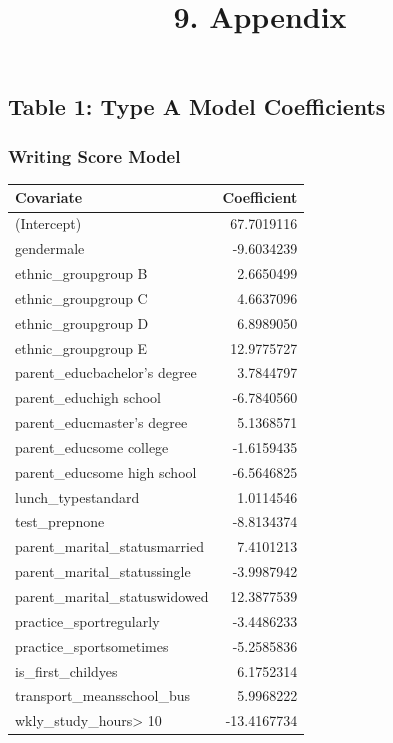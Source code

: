 \documentclass[
]{article}
\title{9. Appendix}
\author{}
\date{\vspace{-2.5em}}
\begin{document}
\maketitle

\subsection{Table 1: Type A Model
Coefficients}\label{table-1-type-a-model-coefficients}

\subsubsection{Writing Score Model}\label{writing-score-model}

\begin{longtable}[]{@{}lr@{}}
\toprule\noalign{}
Covariate & Coefficient \\
\midrule\noalign{}
\endhead
\bottomrule\noalign{}
\endlastfoot
(Intercept) & 67.7019116 \\
gendermale & -9.6034239 \\
ethnic\_groupgroup B & 2.6650499 \\
ethnic\_groupgroup C & 4.6637096 \\
ethnic\_groupgroup D & 6.8989050 \\
ethnic\_groupgroup E & 12.9775727 \\
parent\_educbachelor's degree & 3.7844797 \\
parent\_educhigh school & -6.7840560 \\
parent\_educmaster's degree & 5.1368571 \\
parent\_educsome college & -1.6159435 \\
parent\_educsome high school & -6.5646825 \\
lunch\_typestandard & 1.0114546 \\
test\_prepnone & -8.8134374 \\
parent\_marital\_statusmarried & 7.4101213 \\
parent\_marital\_statussingle & -3.9987942 \\
parent\_marital\_statuswidowed & 12.3877539 \\
practice\_sportregularly & -3.4486233 \\
practice\_sportsometimes & -5.2585836 \\
is\_first\_childyes & 6.1752314 \\
transport\_meansschool\_bus & 5.9968222 \\
wkly\_study\_hours\textgreater{} 10 & -13.4167734 \\

\end{longtable}
\end{document}
